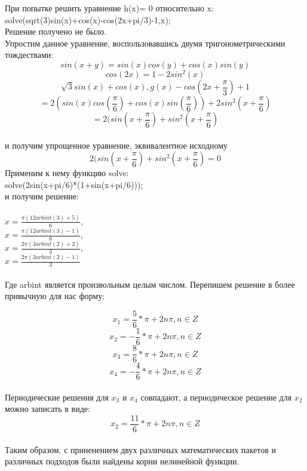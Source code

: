 \documentclass[russian,utf8,nocolumnxxxi,nocolumnxxxii]{eskdtext}
\begin{document}
При попытке решить уравнение h(x)= 0 относительно x:\\
solve(sqrt(3)sin(x)+cos(x)-cos(2x+pi/3)-1,x);\\
Решение получено не было.\\
Упростим данное уравнение, воспользовавшись двумя тригонометрическими тождествами: $$sin(x+y)=sin(x)cos(y)+cos(x)sin(y)$$
$$cos(2x)=1-2sin^2(x)$$
$$\sqrt{3}sin(x)+cos(x),g(x)-cos(2x+\frac{\pi}{3})+1$$ $$=2(sin(x)cos(\frac{\pi}{6})+cos(x)sin(\frac{\pi}{6}))+2sin^2(x+\frac{\pi}{6})$$ $$=2(sin(x+\frac{\pi}{6})+sin^2(x+\frac{\pi}{6})$$\\
и получим упрощенное уравнение, эквивалентное исходному
$$2(sin(x+\frac{\pi}{6})+sin^2(x+\frac{\pi}{6})=0$$
Применим к нему функцию solve:\\
solve(2sin(x+pi/6)*(1+sin(x+pi/6)));\\
и получим решение:\\
\\
$x=\frac{\pi(12arbint(3)+5)}{6}$,\\
$x=\frac{\pi(12arbint(3)-1)}{6}$,\\
$x=\frac{2\pi(3arbint(2)+2)}{3}$,\\
$x=\frac{2\pi(3arbint(2)-1)}{3}$\\
\\

Где arbint является произвольным целым числом. Перепишем решение в более привычную для нас форму:

$$x_1=\frac{5}{6}*\pi+2n\pi,n\in Z$$
$$x_2=-\frac{1}{6}*\pi+2n\pi,n\in Z$$
$$x_3=\frac{8}{6}*\pi+2n\pi,n\in Z$$
$$x_4=-\frac{4}{6}*\pi+2n\pi,n\in Z$$\\
Периодические решения для $x_3$ и $x_4$ совпадают, а периодическое решение для $x_2$ можно записать в виде:
$$x_2=\frac{11}{6}*\pi+2n\pi,n\in Z$$\\
Таким образом, с приненением двух различных математических пакетов и различных подходов были найдены корни нелинейной функции.
\end{document}
